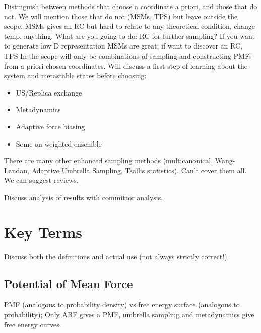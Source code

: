 \documentclass[9pt]{livecoms}
\begin{document}
Distinguish between methods that choose a coordinate a priori, and those that do not. We will mention those that do not (MSMs, TPS) but leave outside the scope.
MSMs gives an RC but hard to relate to any theoretical condition, change temp, anything.
What are you going to do: RC for further sampling? If you want to generate low D representation MSMs are great; if want to discover an RC, TPS
In the scope will only be combinations of sampling and constructing PMFs from a priori chosen coordinates. Will discuss a first step of learning about the system and metastable states before choosing:
\begin{itemize}
\item US/Replica exchange
\item Metadynamics
\item Adaptive force biasing
\item Some on weighted ensemble
\end{itemize}

There are many other enhanced sampling methods (multicanonical, Wang-Landau, Adaptive Umbrella Sampling, Tsallis statistics).  Can't cover them all. We can suggest reviews.

Discuss analysis of results with committor analysis.

\section{Key Terms}

Discuss both the definitions and actual use (not always strictly correct!)

\subsection{Potential of Mean Force}


PMF (analogous to probability density)  vs free energy surface (analogous to probability); Only ABF gives a PMF, umbrella sampling and metadynamics give free energy curves.
\end{document}
